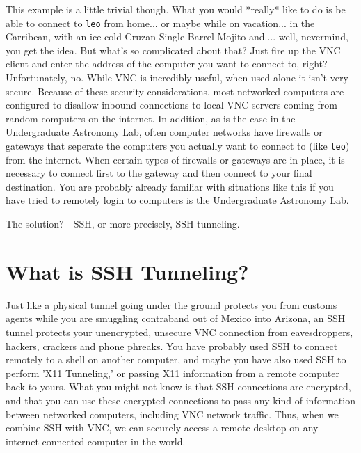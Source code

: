 \documentclass[11pt,preprint]{aastex}
\begin{document}
This example is a little trivial though.  What you would *really* like to do is be able to connect to \verb$leo$ from home... or maybe while on vacation... in the Carribean, with an
ice cold Cruzan Single Barrel Mojito and.... well, nevermind, you get the idea.  But what's so complicated about that?  Just fire up the VNC client and enter the address
of the computer you want to connect to, right?  Unfortunately, no.  While VNC is incredibly useful, when used alone it isn't very secure.  Because of these security considerations, most
networked computers are configured to disallow inbound connections to local VNC servers coming from random computers on the internet.  In addition, as is the case in the Undergraduate Astronomy Lab, often computer networks have firewalls or gateways that seperate the computers you actually want to connect to (like \verb$leo$) from the internet.  When certain types of firewalls or 
gateways are in place, it is necessary to connect first to the gateway and then connect to your final destination.  You are probably already familiar with situations like this
if you have tried to remotely login to computers is the Undergraduate Astronomy Lab.

The solution? - SSH, or more precisely, SSH tunneling.

\section {What is SSH Tunneling?}
Just like a physical tunnel going under the ground protects you from customs agents while you are smuggling contraband out of Mexico into Arizona, an SSH tunnel protects your
unencrypted, unsecure VNC connection from eavesdroppers, hackers, crackers and phone phreaks.  You have probably used SSH to connect remotely to a shell on another computer, and 
maybe you have also used SSH to perform 'X11 Tunneling,' or passing X11 information from a remote computer back to yours.  What you might not know is that SSH connections
are encrypted, and that you can use these encrypted connections to pass any kind of information between networked computers, including VNC network traffic.  Thus, when we combine SSH
with VNC, we can securely access a remote desktop on any internet-connected computer in the world.
\end{document}
